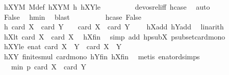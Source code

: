\begin{isabellebody}
\ hXYM\ M{\isacharunderscore}{\kern0pt}def\ hXY{}M\ h\ hXY{}le\ \isanewline
\ \ \ \ \ \ \ \ devos{\isacharunderscore}{\kern0pt}rel{\isacharunderscore}{\kern0pt}iff\ hcase\ \isamarkupfalse%
\ auto\isanewline
\ \ \ \ \isamarkupfalse%
\ \isamarkupfalse%
\ False\ \isamarkupfalse%
\ hmin\ \isamarkupfalse%
\ blast\ \isanewline
\ \ \isamarkupfalse%
\isanewline
\ \ \ \ \isamarkupfalse%
\ hcase{\isacharcolon}{\kern0pt}\ False\isanewline
\ \ \ \ \isamarkupfalse%
\ \isamarkupfalse%
\ h{\isacharcolon}{\kern0pt}\ {\isachardoublequoteopen}card\ {\isacharquery}{\kern0pt}X{}\ {\isacharplus}{\kern0pt}\ card\ {\isacharquery}{\kern0pt}Y{}\ {\isacharminus}{\kern0pt}\ {}\ {\isasymge}\ card\ X\ {\isacharplus}{\kern0pt}\ card\ Y\ {\isacharminus}{\kern0pt}\ {}{\isachardoublequoteclose}\ \isamarkupfalse%
\ hXadd\ hYadd\ \isamarkupfalse%
\ linarith\isanewline
\ \ \ \ \isamarkupfalse%
\ hX{}lt{\isacharcolon}{\kern0pt}\ {\isachardoublequoteopen}card\ {\isacharquery}{\kern0pt}X{}\ {\isacharless}{\kern0pt}\ card\ X{\isachardoublequoteclose}\ \isamarkupfalse%
\ hXfin\ \isamarkupfalse%
\ {\isacharparenleft}{\kern0pt}simp\ add{\isacharcolon}{\kern0pt}\ hpsubX\ psubset{\isacharunderscore}{\kern0pt}card{\isacharunderscore}{\kern0pt}mono{\isacharparenright}{\kern0pt}\isanewline
\ \ \ \ \isamarkupfalse%
\ hXY{}le{\isacharcolon}{\kern0pt}\ {\isachardoublequoteopen}enat\ {\isacharparenleft}{\kern0pt}card\ {\isacharparenleft}{\kern0pt}{\isacharquery}{\kern0pt}X{}\ {\isasymcdots}\ {\isacharquery}{\kern0pt}Y{}{\isacharparenright}{\kern0pt}{\isacharparenright}{\kern0pt}\ {\isasymle}\ card\ {\isacharparenleft}{\kern0pt}X\ {\isasymcdots}\ Y{\isacharparenright}{\kern0pt}{\isachardoublequoteclose}\ \isanewline
\ \ \ \ \ \ \isamarkupfalse%
\ hXY{}\ finite{\isacharunderscore}{\kern0pt}smul\ card{\isacharunderscore}{\kern0pt}mono\ hYfin\ hXfin\ \isamarkupfalse%
\ {\isacharparenleft}{\kern0pt}metis\ enat{\isacharunderscore}{\kern0pt}ord{\isacharunderscore}{\kern0pt}simps{\isacharparenleft}{\kern0pt}{}{\isacharparenright}{\kern0pt}{\isacharparenright}{\kern0pt}\isanewline
\ \ \ \ \isamarkupfalse%
\ \isamarkupfalse%
\ {\isachardoublequoteopen}{\isachardot}{\kern0pt}{\isachardot}{\kern0pt}{\isachardot}{\kern0pt}\ {\isacharless}{\kern0pt}\ min\ p\ {\isacharparenleft}{\kern0pt}card\ X\ {\isacharplus}{\kern0pt}\ card\ Y\ {\isacharminus}{\kern0pt}\ {}{\isacharparenright}{\kern0pt}{\isachardoublequoteclose}\ \isamarkupfalse%

\end{isabellebody}
